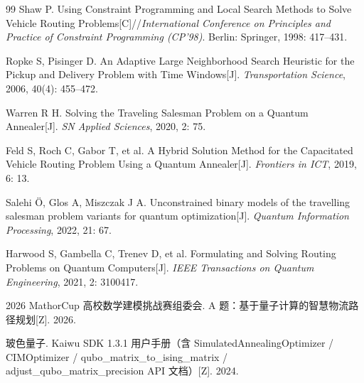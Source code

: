 \documentclass[UTF8,12pt,a4paper]{ctexart}
\begin{document}
\begin{thebibliography}{99}
Shaw P. Using Constraint Programming and Local Search Methods to Solve Vehicle Routing Problems[C]//\emph{International Conference on Principles and Practice of Constraint Programming (CP'98)}. Berlin: Springer, 1998: 417--431.

Ropke S, Pisinger D. An Adaptive Large Neighborhood Search Heuristic for the Pickup and Delivery Problem with Time Windows[J]. \emph{Transportation Science}, 2006, 40(4): 455--472.

Warren R H. Solving the Traveling Salesman Problem on a Quantum Annealer[J]. \emph{SN Applied Sciences}, 2020, 2: 75.

Feld S, Roch C, Gabor T, et al. A Hybrid Solution Method for the Capacitated Vehicle Routing Problem Using a Quantum Annealer[J]. \emph{Frontiers in ICT}, 2019, 6: 13.

Salehi Ö, Glos A, Miszczak J A. Unconstrained binary models of the travelling salesman problem variants for quantum optimization[J]. \emph{Quantum Information Processing}, 2022, 21: 67.

Harwood S, Gambella C, Trenev D, et al. Formulating and Solving Routing Problems on Quantum Computers[J]. \emph{IEEE Transactions on Quantum Engineering}, 2021, 2: 3100417.

2026 MathorCup 高校数学建模挑战赛组委会. A 题：基于量子计算的智慧物流路径规划[Z]. 2026.

玻色量子. Kaiwu SDK 1.3.1 用户手册（含 SimulatedAnnealingOptimizer / CIMOptimizer / qubo\_matrix\_to\_ising\_matrix / adjust\_qubo\_matrix\_precision API 文档）[Z]. 2024.

\end{thebibliography}
\end{document}
